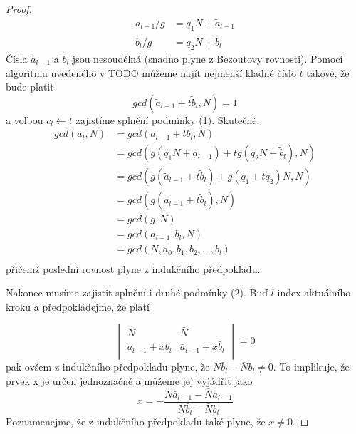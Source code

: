 \begin{proof}
\begin{equation}\label{division}
    \begin{split}
        a_{l - 1} / g & = q_1 N +  \tilde{a}_{l-1} \\
        b_{l} / g & = q_2 N +  \tilde{b}_{l}
    \end{split}
\end{equation}
Čísla $ \tilde{a}_{l-1} $ a $ \tilde{b}_{l} $ jsou nesoudělná (snadno plyne z
Bezoutovy rovnosti). Pomocí
algoritmu uvedeného v TODO můžeme najít nejmenší kladné číslo $ t $ takové, že bude
platit
\begin{equation}\label{t_search}
    gcd(\tilde{a}_{l-1} + t \tilde{b}_{l}, N) = 1
\end{equation}
a volbou $ c_l \leftarrow t $ zajistíme splnění podmínky (1). Skutečně:
\begin{align*}
    gcd(a_l, N) &= gcd(a_{l-1} + t b_l, N)  \\
                &= gcd(g (q_1 N +  \tilde{a}_{l-1})
                        + tg(q_2 N + \tilde{b}_{l}), N) \\
                &= gcd(g (\tilde{a}_{l-1} + t \tilde{b}_{l})
                        + g (q_1 + t q_2) N, N) \\
                &= gcd(g (\tilde{a}_{l-1} + t \tilde{b}_{l}), N) \\
                &= gcd(g, N) \\
                &= gcd(a_{l-1}, b_l, N) \\
                &= gcd(N, a_0, b_1, b_2, \dots, b_l) \\
\end{align*}
přičemž poslední rovnost plyne z indukčního předpokladu.

Nakonec musíme zajistit splnění i druhé podmínky (2). Buď $ l $ index aktuálního
kroku a předpokládejme, že platí

\begin{equation}\label{det}
    \begin{vmatrix}
        N & \bar{N} \\
        a_{l-1} + x b_l & \bar{a}_{l-1} + x \bar{b}_l  \\
    \end{vmatrix}
    = 0
\end{equation}
pak ovšem z indukčního předpokladu plyne, že $ N \bar{b}_l - \bar{N} b_l \neq 0 $.
To implikuje, že prvek x je určen jednoznačně a můžeme jej vyjádřit jako
\begin{equation}\label{frac}
    x = -\frac{N \bar{a}_{l-1} - \bar{N} a_{l-1}} {N \bar{b}_l - \bar{N} b_l}
\end{equation}
Poznamenejme, že z indukčního předpokladu také plyne, že $ x \neq 0 $.


\end{proof}
